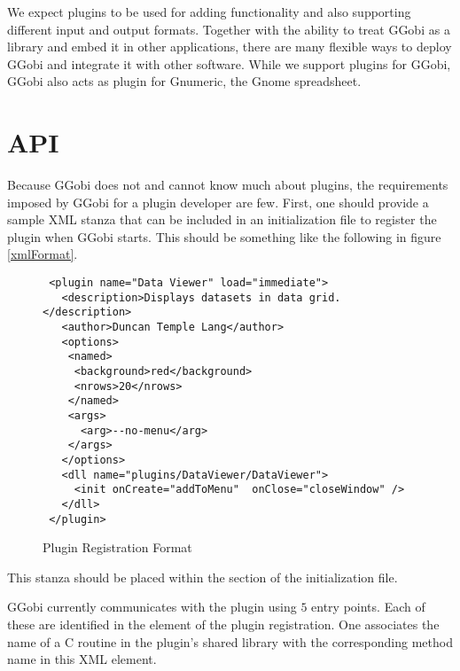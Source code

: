 \documentclass{article}
\begin{document}
We expect plugins to be used for adding functionality and also
supporting different input and output formats.  Together with the
ability to treat GGobi as a library and embed it in other
applications, there are many flexible ways to deploy GGobi and
integrate it with other software.  While we support plugins for GGobi,
GGobi also acts as plugin for Gnumeric, the Gnome spreadsheet.


\begin{comment}
\section{Hooks and Events}
Allow the plugin to write to the stored data
in the ggobirc.  
\end{comment}

\section{API}
Because GGobi does not and cannot know much about plugins, the
requirements imposed by GGobi for a plugin developer are few.
First, one should provide a sample XML stanza that can be included in
an initialization file to register the plugin when GGobi starts.  This
should be something like the following in figure \ref{xmlFormat}.

\begin{figure}[htbp]
  \begin{center}
    \leavevmode
\begin{verbatim}
 <plugin name="Data Viewer" load="immediate">
   <description>Displays datasets in data grid.</description>
   <author>Duncan Temple Lang</author>
   <options>
    <named>
     <background>red</background>
     <nrows>20</nrows>
    </named>
    <args>
      <arg>--no-menu</arg>
    </args>
   </options>
   <dll name="plugins/DataViewer/DataViewer">
     <init onCreate="addToMenu"  onClose="closeWindow" />
   </dll>
 </plugin>    
\end{verbatim}
    \caption{Plugin Registration Format}
    \label{fig:xmlRegistration}
  \end{center}
\end{figure}

This stanza should be placed within the 
section of the initialization file.

GGobi currently communicates with the plugin using $5$ entry points.
Each of these are identified in the  element of the
plugin registration.  One associates the name of a C routine in the
plugin's shared library with the corresponding method name in this XML
element.
 
\end{document}
